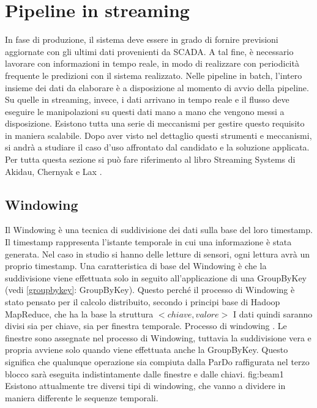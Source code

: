 \chapter{Pipeline in streaming}\label{pipelinestreaming}
In fase di produzione, il sistema deve essere in grado di fornire previsioni aggiornate con gli ultimi dati provenienti da SCADA. A tal fine, è necessario lavorare con informazioni in tempo reale, in modo di realizzare con periodicità frequente le predizioni con il sistema realizzato. Nelle pipeline in batch, l’intero insieme dei dati da elaborare è a disposizione al momento di avvio della pipeline. Su quelle in streaming, invece, i dati arrivano in tempo reale e il flusso deve eseguire le manipolazioni su questi dati mano a mano che vengono messi a disposizione. Esistono tutta una serie di meccanismi per gestire questo requisito in maniera scalabile. Dopo aver visto nel dettaglio questi strumenti e meccanismi, si andrà a studiare il caso d’uso affrontato dal candidato e la soluzione applicata. Per tutta questa sezione si può fare riferimento al libro Streaming Systems di Akidau, Chernyak e Lax \cite{akidauchernyaklax}.
\section{Windowing}\label{windowing}
Il Windowing è una tecnica di suddivisione dei dati sulla base del loro timestamp. Il timestamp rappresenta l’istante temporale in cui una informazione è stata generata. Nel caso in studio si hanno delle letture di sensori, ogni lettura avrà un proprio timestamp. Una caratteristica di base del Windowing è che la suddivisione viene effettuata solo in seguito all’applicazione di una GroupByKey (vedi \ref{groupbykey}: GroupByKey). Questo perché il processo di Windowing è stato pensato per il calcolo distribuito, secondo i principi base di Hadoop MapReduce, che ha la base la struttura $ <chiave, valore> $ I dati quindi saranno divisi sia per chiave, sia per finestra temporale.
{Processo di windowing \cite{apachebeam}. Le finestre sono assegnate nel processo di Windowing, tuttavia la suddivisione vera e propria avviene solo quando viene effettuata anche la GroupByKey. Questo significa che qualunque operazione sia compiuta dalla ParDo raffigurata nel terzo blocco sarà eseguita indistintamente dalle finestre e dalle chiavi. } 
{fig:beam1}
Esistono attualmente tre diversi tipi di windowing, che vanno a dividere in maniera differente le sequenze temporali.
